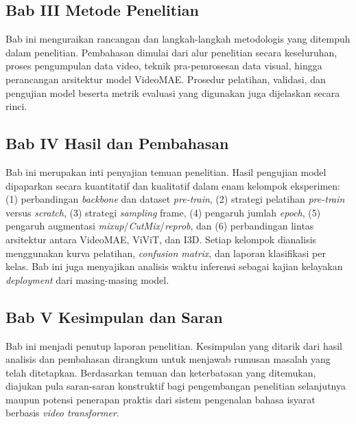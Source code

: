 \subsection{Bab III Metode Penelitian}
Bab ini menguraikan rancangan dan langkah-langkah metodologis yang ditempuh dalam penelitian. Pembahasan dimulai dari alur penelitian secara keseluruhan, proses pengumpulan data video, teknik pra-pemrosesan data visual, hingga perancangan arsitektur model VideoMAE. Prosedur pelatihan, validasi, dan pengujian model beserta metrik evaluasi yang digunakan juga dijelaskan secara rinci.\par

\subsection{Bab IV Hasil dan Pembahasan}
Bab ini merupakan inti penyajian temuan penelitian. Hasil pengujian model dipaparkan secara kuantitatif dan kualitatif dalam enam kelompok eksperimen: (1) perbandingan \textit{backbone} dan dataset \textit{pre-train}, (2) strategi pelatihan \textit{pre-train} versus \textit{scratch}, (3) strategi \textit{sampling} frame, (4) pengaruh jumlah \textit{epoch}, (5) pengaruh augmentasi \textit{mixup}/\textit{CutMix}/\textit{reprob}, dan (6) perbandingan lintas arsitektur antara VideoMAE, ViViT, dan I3D. Setiap kelompok dianalisis menggunakan kurva pelatihan, \textit{confusion matrix}, dan laporan klasifikasi per kelas. Bab ini juga menyajikan analisis waktu inferensi sebagai kajian kelayakan \textit{deployment} dari masing-masing model.\par

\subsection{Bab V Kesimpulan dan Saran}
Bab ini menjadi penutup laporan penelitian. Kesimpulan yang ditarik dari hasil analisis dan pembahasan dirangkum untuk menjawab rumusan masalah yang telah ditetapkan. Berdasarkan temuan dan keterbatasan yang ditemukan, diajukan pula saran-saran konstruktif bagi pengembangan penelitian selanjutnya maupun potensi penerapan praktis dari sistem pengenalan bahasa isyarat berbasis \textit{video transformer}.\par
